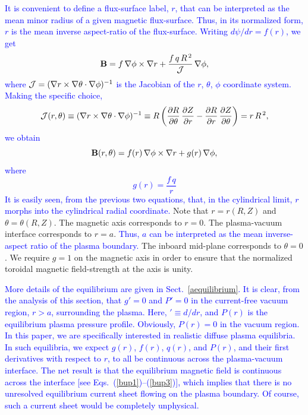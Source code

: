 \documentclass[12pt,prb,aps]{revtex4-1}
\begin{document}
\textcolor{blue}{It is convenient to define a flux-surface label, $r$, that can be interpreted as the mean minor radius of a given magnetic flux-surface. Thus,
in its normalized form, $r$ is the mean inverse aspect-ratio of the flux-surface. Writing $d\psi/dr=f(r)$, we get
\begin{equation}
{\bf B} =f\,\nabla\phi\times\nabla r + \frac{f\,q\,R^{\,2}}{{\cal J}}\,\nabla\phi,
\end{equation}
where ${\cal J}= (\nabla r\times\nabla\theta\cdot\nabla\phi)^{-1}$ is the Jacobian of the $r$, $\theta$, $\phi$ coordinate system. 
Making the specific choice,\cite{bussac,connor}
\begin{equation}\label{jac}
{\cal J}(r,\theta)\equiv (\nabla r\times \nabla\theta\cdot\nabla\phi)^{-1} \equiv R\left(\frac{\partial R}{\partial\theta}\,\frac{\partial Z}{\partial r} -\frac{\partial R}{\partial r}\,\frac{\partial Z}{\partial \theta}\right)= r\,R^{\,2},
\end{equation}
we obtain
\begin{equation}\label{bfield}
{\bf B}(r,\theta) = f(r)\,\nabla\phi\times \nabla r + g(r)\,\nabla\phi,
\end{equation}
where
\begin{equation}\label{q}
g(r) = \frac{f\,q}{r}
\end{equation}
It is easily seen, from the previous two equations, that, in the cylindrical limit, $r$ morphs into the cylindrical
radial coordinate. }
Note that $r=r(R,Z)$ and $\theta=\theta(R,Z)$. 
The magnetic axis corresponds to $r=0$. The plasma-vacuum interface corresponds to $r=a$. \textcolor{blue}{Thus, $a$ can be interpreted as the
mean inverse-aspect ratio of the plasma boundary.} The inboard mid-plane corresponds to $\theta=0$. 
We require $g=1$ on the magnetic axis in order to ensure that the normalized toroidal magnetic field-strength at the  axis is unity.  

\textcolor{blue}{More details of the equilibrium are given in Sect.~\ref{aequilibrium}. It is clear, from the analysis of this section, that
$g'=0$ and $P'=0$ in the current-free vacuum region, $r>a$, surrounding the plasma. Here, $'\equiv d/dr$, and $P(r)$
is the equilibrium plasma pressure profile. Obviously,  $P(r)=0$ in the vacuum region. In this paper, we are specifically interested in realistic diffuse plasma equilibria. In such equilibria, we expect $g(r)$, $f(r)$, $q(r)$, and $P(r)$, and their first derivatives with respect to $r$, to all be continuous across the plasma-vacuum interface.
 The net result is that the equilibrium magnetic field is continuous across the 
interface [see Eqs.~(\ref{bup1})--(\ref{bup3})], which implies that there is no unresolved equilibrium current sheet flowing on the plasma boundary. Of course, such a
current sheet would be completely unphysical. }
\end{document}
